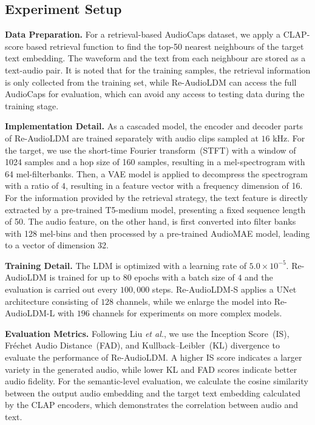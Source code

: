 \documentclass{article}
\begin{document}
\subsection{Experiment Setup}

\textbf{Data Preparation.}
For a retrieval-based AudioCaps dataset, we apply a CLAP-score based retrieval function to find the top-50 nearest neighbours of the target text embedding. The waveform and the text from each neighbour are stored as a text-audio pair. It is noted that for the training samples, the retrieval information is only collected from the training set, while Re-AudioLDM can access the full AudioCaps for evaluation, which can avoid any access to testing data during the training stage.

\noindent
\textbf{Implementation Detail.}
As a cascaded model, the encoder and decoder parts of Re-AudioLDM are trained separately with audio clips sampled at $16$ kHz. For the target, we use the short-time Fourier transform~(STFT) with a window of 1024 samples and a hop size of 160 samples, resulting in a mel-spectrogram with 64 mel-filterbanks. Then, a VAE model is applied to decompress the spectrogram with a ratio of $4$, resulting in a feature vector with a frequency dimension of 16. For the information provided by the retrieval strategy, the text feature is directly extracted by a pre-trained T5-medium model, presenting a fixed sequence length of 50. The audio feature, on the other hand, is first converted into filter banks with 128 mel-bins and then processed by a pre-trained AudioMAE model, leading to a vector of dimension 32. 

\noindent
\textbf{Training Detail.}
The LDM is optimized with a learning rate of $5.0\times10^{-5}$. Re-AudioLDM is trained for up to $80$ epochs with a batch size of $4$ and the evaluation is carried out every $100,000$ steps. Re-AudioLDM-S applies a UNet architecture consisting of $128$ channels, while we enlarge the model into Re-AudioLDM-L with $196$ channels for experiments on more complex models. 

\noindent
\textbf{Evaluation Metrics.}
Following Liu \textit{et al.}, we use the Inception Score~(IS), Fréchet Audio Distance~(FAD), and Kullback–Leibler~(KL) divergence to evaluate the performance of Re-AudioLDM. A higher IS score indicates a larger variety in the generated audio, while lower KL and FAD scores indicate better audio fidelity. For the semantic-level evaluation, we calculate the cosine similarity between the output audio embedding and the target text embedding calculated by the CLAP encoders, which demonstrates the correlation between audio and text.
\end{document}
